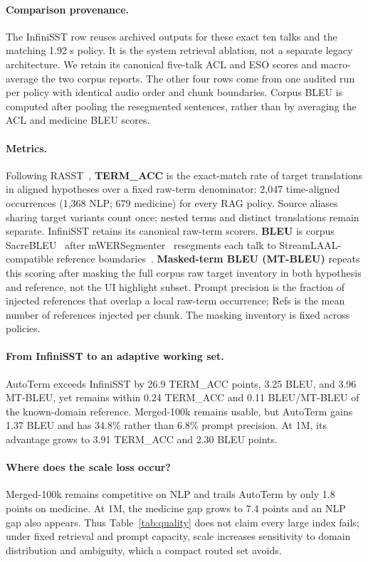 \paragraph{Comparison provenance.}
The InfiniSST row reuses archived outputs for these exact ten talks and the
matching 1.92 s policy. It is the system retrieval ablation, not a separate legacy
architecture. We retain its canonical five-talk ACL and ESO scores and
macro-average the two corpus reports. The other four
rows come from one audited run per policy with identical audio order and chunk
boundaries. Corpus BLEU is computed after pooling the resegmented sentences,
rather than by averaging the ACL and medicine BLEU scores.

\paragraph{Metrics.}
Following RASST~\citep{luo2026rasst}, \textbf{TERM\_ACC} is the exact-match rate
of target translations in aligned hypotheses over a fixed raw-term denominator: 2,047
time-aligned occurrences (1,368 NLP; 679 medicine) for every RAG policy. Source
aliases sharing target variants count once; nested terms and distinct
translations remain separate. InfiniSST retains its canonical raw-term scorers.
\textbf{BLEU} is corpus SacreBLEU~\citep{papineni-etal-2002-bleu,post-2018-call}
after mWERSegmenter~\citep{matusov-etal-2005-evaluating} resegments each talk to
StreamLAAL-compatible reference boundaries~\citep{papi2024streamatt}.
\textbf{Masked-term BLEU (MT-BLEU)} repeats this scoring after masking the full
corpus raw target inventory in both hypothesis and reference, not the UI
highlight subset. Prompt precision is
the fraction of injected references that overlap a local raw-term occurrence;
Refs is the mean number of references injected per chunk. The masking inventory
is fixed across policies.

\paragraph{From InfiniSST to an adaptive working set.}
AutoTerm exceeds InfiniSST by 26.9 TERM\_ACC points, 3.25 BLEU, and 3.96
MT-BLEU, yet remains within 0.24 TERM\_ACC and 0.11 BLEU/MT-BLEU of the
known-domain reference. Merged-100k remains usable, but AutoTerm gains 1.37
BLEU and has 34.8\% rather than 6.8\% prompt precision. At 1M, its advantage
grows to 3.91 TERM\_ACC and 2.30 BLEU points.

\paragraph{Where does the scale loss occur?}
Merged-100k remains competitive on NLP and trails AutoTerm by only 1.8 points
on medicine. At 1M, the medicine gap grows to 7.4 points and an NLP gap also
appears. Thus Table~\ref{tab:quality} does not claim every large index fails;
under fixed retrieval and prompt capacity, scale increases sensitivity to
domain distribution and ambiguity, which a compact routed set avoids.

